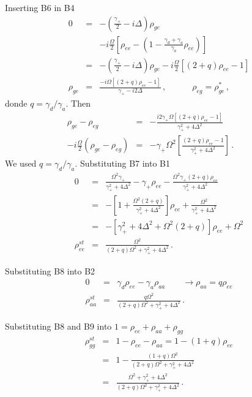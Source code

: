 \documentclass[twocolumn,aps,eqsecnum,showkeys,amsmath]{revtex4-2}
\begin{document}
Inserting B6 in B4
%
\begin{eqnarray*}
0 &=& -\left( \frac{\gamma_+}{2} -i\Delta \right) \rho_{ge} \\
    && -i\frac{\Omega}{2} \left[ \rho_{ee} 
    -\left( 1- \frac{\gamma_d +\gamma_a}{\gamma_a}  \rho_{ee} \right)
    \right]     \\
&=& -\left( \frac{\gamma_+}{2} -i\Delta \right) \rho_{ge} 
    -i\frac{\Omega}{2} \left[  (2+q) \rho_{ee} -1 \right]     \\ 
\rho_{ge} &=& 
   \frac{ -i\Omega \left[ (2+q) \rho_{ee} -1 \right]}{\gamma_+ -i2\Delta} \,,    
       \qquad \quad \rho_{eg} = \rho_{ge}^{\ast}   \,,
\end{eqnarray*}
donde $q= \gamma_d /\gamma_a$. Then
%
\begin{eqnarray}
\rho_{ge} -\rho_{eg} &=& 
	- \frac{ i 2\gamma_+ \Omega \left[ (2+q) \rho_{ee} -1 \right]}
       {\gamma_+^2 +4\Delta^2}     	\nonumber \\
-i \frac{\Omega}{2} \left( \rho_{ge} -\rho_{eg} \right) 
&=& - \gamma_+ \Omega^2  \left[ \frac{ (2+q) \rho_{ee} -1 }
       {\gamma_+^2 +4\Delta^2} \right]  \,.   \qquad
\end{eqnarray}
We used $q=\gamma_d/\gamma_a$. Substituting B7 into B1 
%
\begin{eqnarray}
0 &=& \frac{ \Omega^2 \gamma_+}{\gamma_+^2 +4\Delta^2} 
       -\gamma_+ \rho_{ee}     
- \frac{ \Omega^2 \gamma_+ (2+q) \rho_{ee} }
       {\gamma_+^2 +4\Delta^2}      \nonumber  \\ 
&=& -\left[ 1+  \frac{ \Omega^2 (2+q) }
       {\gamma_+^2 +4\Delta^2} \right] \rho_{ee} 
	+\frac{ \Omega^2 }{\gamma_+^2 +4\Delta^2}    \nonumber  \\
&=& -\left[ \gamma_+^2 +4\Delta^2 +\Omega^2 (2+q) 
    \right] \rho_{ee} +\Omega^2 		 \nonumber \\
\rho_{ee}^{st} &=& \frac{\Omega^2}{ (2+q) \Omega^2  
    +\gamma_+^2 +4\Delta^2 } 	\,.
\end{eqnarray}

Substituting B8 into B2 
%
\begin{eqnarray} 
0 &=& \gamma_d \rho_{ee} -\gamma_a \rho_{aa} 
    \qquad \to \rho_{aa} =q \rho_{ee}   \nonumber  \\
\rho_{aa}^{st} &=& 
	\frac{q\Omega^2}{ (2+q) \Omega^2  +\gamma_+^2 +4\Delta^2 } \,.
\end{eqnarray}

Substituting B8 and B9 into $1=\rho_{ee} +\rho_{aa} +\rho_{gg}$
%
\begin{eqnarray} 
\rho_{gg}^{st} &=& 1- \rho_{ee} -\rho_{aa} = 1-(1+q) \rho_{ee}     
    \nonumber     \\
&=& 1- \frac{ (1+q) \Omega^2}{ (2+q) \Omega^2  
    +\gamma_+^2 +4\Delta^2 }     \nonumber \\
&=& \frac{ \Omega^2 +\gamma_+^2 +4\Delta^2 }
    { (2+q) \Omega^2 +\gamma_+^2 +4\Delta^2 } 	\,.
\end{eqnarray}
\end{document}
